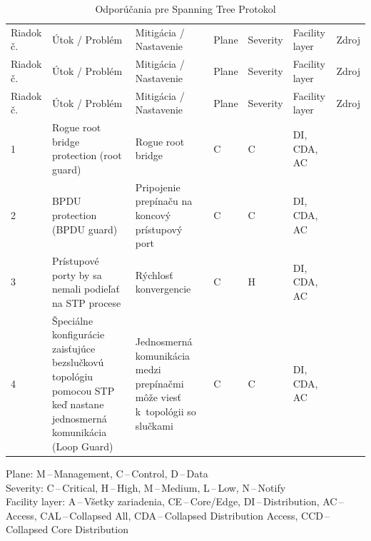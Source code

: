 \begin{longtable}[!htbp]{|C{2.5em}L{11em}L{11em}C{2.5em}C{4em}C{5em}L{2.5em}|}
	
	\caption{Odporúčania pre Spanning Tree Protokol}
	\label{tab:stp}\\ \hline
	\mbox{Riadok} č.&Útok / Problém	&Mitigácia / Nastavenie	&Plane	&Severity	&Facility layer	&Zdroj\\ \hhline{=======}
	\endfirsthead 
	\hline
	\centering
	
	Riadok č.	&Útok / Problém	&Mitigácia / Nastavenie	&Plane	&Severity	&Facility layer	&Zdroj\\ \hhline{=======}
	\endhead
	
	Riadok č.	&Útok / Problém	&Mitigácia / Nastavenie	&Plane	&Severity	&Facility layer	&Zdroj\\
	\endhead
	
	 1	&Rogue root bridge protection (root guard)	&Rogue root bridge 	&C	&C	&DI,
	CDA,
	AC	& \cite{Vyncke2008}\\
	2	&BPDU protection (BPDU guard)	&Pripojenie prepínaču na koncový prístupový port	&C	&C	&DI,
	CDA,
	AC	& \cite{Vyncke2008}\\
	 3	&Prístupové porty by sa nemali podieľať na STP procese	&Rýchlosť konvergencie	&C	&H	&DI,
	CDA,
	AC	& \cite{Vyncke2008}\\
	4	&Špeciálne konfigurácie zaisťujúce bezslučkovú topológiu pomocou STP keď nastane jednosmerná komunikácia (Loop Guard)	&Jednosmerná komunikácia medzi prepínačmi môže viesť k~topológii so slučkami	&C	&C	&DI,
	CDA,
	AC	& \cite{Tiso2012}\\
	
	\hline
	
\end{longtable}%
\vspace{-1em}
{\tiny 
	\noindent
	Plane: M\,--\,Management, C\,--\,Control, D\,--\,Data\\
	Severity: C\,--\,Critical, H\,--\,High, M\,--\,Medium, L\,--\,Low, N\,--\,Notify\\
	Facility layer: A\,--\,Všetky zariadenia, CE\,--\,Core/Edge, DI\,--\,Distribution, AC\,--\,Access, CAL\,--\,Collapsed All, CDA\,--\,Collapsed Distribution Access, CCD\,--\,Collapsed Core Distribution}

